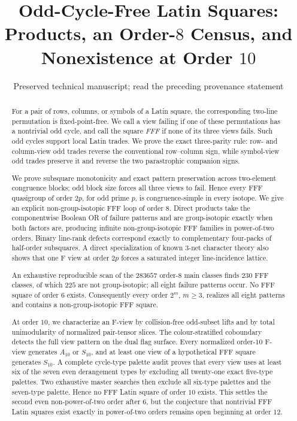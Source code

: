 \documentclass[11pt]{article}
\title{Odd-Cycle-Free Latin Squares:\\
  Products, an Order-$8$ Census, and Nonexistence at Order $10$}
\author{}
\date{\small Preserved technical manuscript; read the preceding provenance statement}
\theoremstyle{definition}
\theoremstyle{remark}
\begin{document}



\maketitle

\begin{abstract}
For a pair of rows, columns, or symbols of a Latin square, the corresponding
two-line permutation is fixed-point-free.  We call a view failing if one of
these permutations has a nontrivial odd cycle, and call the square
\emph{FFF} if none of its three views fails.  Such odd cycles support local
Latin trades.  We prove the exact three-parity rule: row- and column-view odd
trades reverse the conventional row--column sign, while symbol-view odd
trades preserve it and reverse the two parastrophic companion signs.

We prove subsquare monotonicity and exact pattern preservation across
two-element congruence blocks; odd block size forces all three views to fail.
Hence every FFF quasigroup of order $2p$, for odd prime $p$, is
congruence-simple in every isotope.  We give an explicit non-group-isotopic
FFF loop of order $8$.  Direct products take the componentwise Boolean OR of
failure patterns and are group-isotopic exactly when both factors are,
producing infinite non-group-isotopic FFF families in power-of-two orders.
Binary line-rank defects correspond exactly to complementary four-packs of
half-order subsquares.  A direct specialization of known $3$-net character
theory also shows that one F view at order $2p$ forces a saturated integer
line-incidence lattice.

An exhaustive reproducible scan of the $283657$ order-$8$ main classes finds
$230$ FFF classes, of which $225$ are not group-isotopic; all eight failure
patterns occur.  No FFF square of order $6$ exists.  Consequently every order
$2^m$, $m\geq3$, realizes all eight patterns and contains a non-group-isotopic
FFF square.

At order $10$, we characterize an F-view by collision-free
odd-subset lifts and by total unimodularity of normalized pair-tensor slices.
The colour-stratified coboundary detects the full view pattern on the dual
flag surface.
Every normalized order-$10$ F-view generates $A_{10}$ or $S_{10}$, and at
least one view of a hypothetical FFF square generates $S_{10}$.  A complete
cycle-type palette audit proves that every view uses at least six of the seven
even derangement types by excluding all twenty-one exact five-type palettes.
Two exhaustive master searches then exclude all six-type palettes and the
seven-type palette.  Hence no FFF Latin square of order $10$ exists.  This
settles the second even non-power-of-two order after $6$, but the conjecture
that nontrivial FFF Latin squares exist exactly in power-of-two orders remains
open beginning at order $12$.
\end{abstract}
\end{document}
